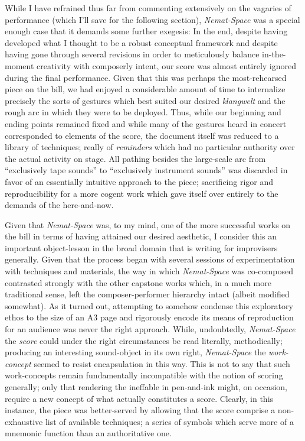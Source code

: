     While I have refrained thus far from commenting extensively on the vagaries of performance (which I'll save for the following section), \textit{Nemat-Space} was a special enough case that it demands some further exegesis: In the end, despite having developed what I thought to be a robust conceptual framework and despite having gone through several revisions in order to meticulously balance in-the-moment creativity with composerly intent, our score was almost entirely ignored during the final performance. Given that this was perhaps the most-rehearsed piece on the bill, we had enjoyed a considerable amount of time to internalize precisely the sorts of gestures which best suited our desired \textit{klangwelt} and the rough arc in which they were to be deployed. Thus, while our beginning and ending points remained fixed and while many of the gestures heard in concert corresponded to elements of the score, the document itself was reduced to a library of techniques; really of \textit{reminders} which had no particular authority over the actual activity on stage. All pathing besides the large-scale arc from ``exclusively tape sounds'' to ``exclusively instrument sounds'' was discarded in favor of an essentially intuitive approach to the piece; sacrificing rigor and reproducibility for a more cogent work which gave itself over entirely to the demands of the here-and-now.
    
    Given that \textit{Nemat-Space} was, to my mind, one of the more successful works on the bill in terms of having attained our desired aesthetic, I consider this an important object-lesson in the broad domain that is writing for improvisers generally. Given that the process began with several sessions of experimentation with techniques and materials, the way in which \textit{Nemat-Space} was co-composed contrasted strongly with the other capstone works which, in a much more traditional sense, left the composer-performer hierarchy intact (albeit modified somewhat). As it turned out, attempting to somehow condense this exploratory ethos to the size of an A3 page and rigorously encode its means of reproduction for an audience was never the right approach. While, undoubtedly, \textit{Nemat-Space} the \textit{score} could under the right circumstances be read literally, methodically; producing an interesting sound-object in its own right, \textit{Nemat-Space} the \textit{work-concept} seemed to resist encapsulation in this way. This is not to say that such work-concepts remain fundamentally incompatible with the notion of scoring generally; only that rendering the ineffable in pen-and-ink might, on occasion, require a new concept of what actually constitutes a score. Clearly, in this instance, the piece was better-served by allowing that the score comprise a non-exhaustive list of available techniques; a series of symbols which serve more of a mnemonic function than an authoritative one. 
    
